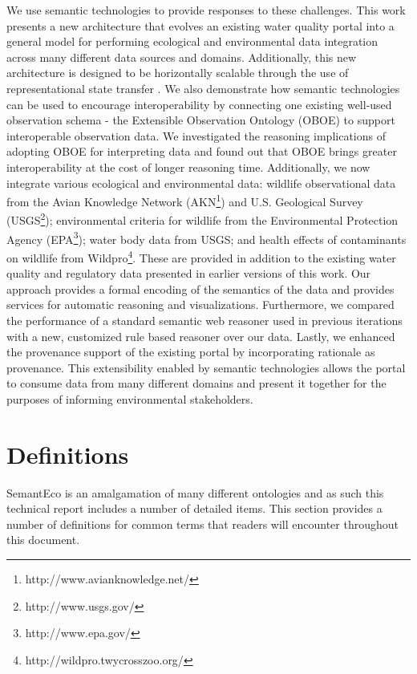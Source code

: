 \documentclass[letterpaper]{report}
\begin{document}
We use semantic technologies to provide responses to these challenges. This work presents a new architecture that evolves an existing water quality portal into a general model for performing ecological and environmental data integration across many different data sources and domains. Additionally, this new architecture is designed to be horizontally scalable through the use of representational state transfer \cite{REST}. We also demonstrate how semantic technologies can be used to encourage interoperability by connecting one existing well-used observation schema - the Extensible Observation Ontology (OBOE) \cite{OBOE} to support interoperable observation data. We investigated the reasoning implications of adopting OBOE for interpreting data and found out that OBOE brings greater interoperability at the cost of longer reasoning time. Additionally, we now integrate various ecological and environmental data: wildlife observational data from the Avian Knowledge Network (AKN\footnote{http://www.avianknowledge.net/}) and U.S. Geological Survey (USGS\footnote{http://www.usgs.gov/}); environmental criteria for wildlife from the Environmental Protection Agency (EPA\footnote{http://www.epa.gov/}); water body data from USGS; and health effects of contaminants on wildlife from Wildpro\footnote{http://wildpro.twycrosszoo.org/}. These are provided in addition to the existing water quality and regulatory data presented in earlier versions of this work. Our approach provides a formal encoding of the semantics of the data and provides services for automatic reasoning and visualizations. Furthermore, we compared the performance of a standard semantic web reasoner used in previous iterations with a new, customized rule based reasoner over our data. Lastly, we enhanced the provenance support of the existing portal by incorporating rationale as provenance. This extensibility enabled by semantic technologies allows the portal to consume data from many different domains and present it together for the purposes of informing environmental stakeholders.

\section{Definitions}
SemantEco is an amalgamation of many different ontologies and as such this technical report includes a number of detailed items. This section provides a number of definitions for common terms that readers will encounter throughout this document.
\end{document}
